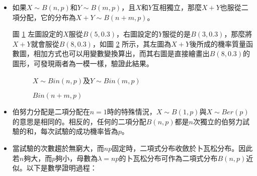 \begin{itemize}
\item 如果$X \sim B(n,p)$和$Y \sim B(m,p)$，且$X$和$Y$互相獨立，那麼$X+Y$也服從二項分配，它的分布為$X+Y \sim B(n+m,p)$。

圖 \ref{fig:binomial(n,p)binomial(m,p)} 左圖設定的$X$服從$B(5,0.3)$，右圖設定的$Y$服從的是$B(3,0.3)$，那麼將$X+Y$就會服從$B(8,0.3)$，如圖 \ref{fig:binomial(n+m,p)} 所示，其左圖為$X+Y$後所成的機率質量函數圖，相加方式也可以用變數變換算出，而其右圖是直接繪畫出$B(8,0.3)$的圖形，可發現兩者為一模一樣，驗證此結果。
\begin{figure}[h]
    \caption{$X \sim Bin(n,p)$及$Y \sim Bin(m,p)$}
    \label{fig:binomial(n,p)binomial(m,p)}
\end{figure}
\begin{figure}[h]
    \caption{$Bin(n+m,p)$}
    \label{fig:binomial(n+m,p)}
\end{figure}

\item 伯努力分配是二項分配在$n=1$時的特殊情況，$X \sim B(1,p)$與$X\sim Ber(p)$的意思是相同的。相反的，任何的二項分配$B(n,p)$都是$n$次獨立的伯努力試驗的和，每次試驗的成功機率皆為$p$。


 
\item 當試驗的次數趨於無窮大，而$np$固定時，二項式分布收斂於卜瓦松分布。因此若$n$夠大，而$p$夠小，母數為$\lambda =np$的卜瓦松分布可作為二項式分布$B(n,p)$近似。以下是數學證明過程：


\end{itemize}
